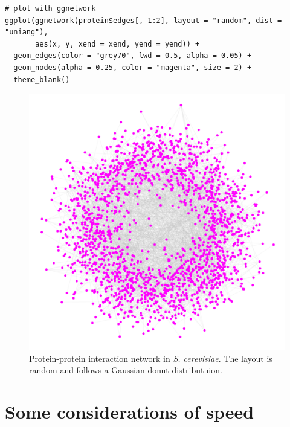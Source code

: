 \begin{knitrout}
\color{fgcolor}\begin{kframe}
\begin{verbatim}
# plot with ggnetwork
ggplot(ggnetwork(protein$edges[, 1:2], layout = "random", dist = "uniang"),
       aes(x, y, xend = xend, yend = yend)) +
  geom_edges(color = "grey70", lwd = 0.5, alpha = 0.05) +
  geom_nodes(alpha = 0.25, color = "magenta", size = 2) +
  theme_blank()
\end{verbatim}
\end{kframe}
\end{knitrout}
\begin{figure}[hbtp]
\includegraphics[width=\textwidth]{figure/yeast_geom_net-1.pdf}
\caption{\label{fig.cap:yeast} Protein-protein interaction network in \emph{S. cerevisiae}. The layout is random and follows a Gaussian donut distributuion.}
\end{figure}

\section{Some considerations of speed}\label{sec:speed}

